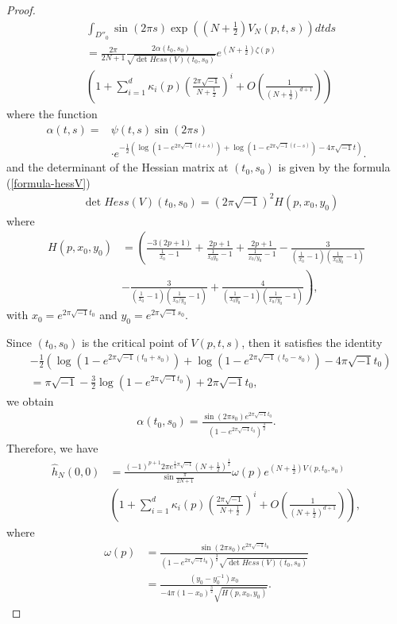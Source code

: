 \documentclass[12pt]{amsart}
\begin{document}
\begin{proof}
\begin{align}
  &\int_{D''_0}\sin(2\pi s)\exp\left((N+\frac{1}{2})V_N(p,t,s)\right)dtds\\\nonumber
        &=\frac{2\pi}{2N+1}\frac{2\alpha(t_0,s_0)}{\sqrt{\det Hess(V)(t_0,s_0)}}e^{(N+\frac{1}{2})\zeta(p)}\\\nonumber
        &\left(1+\sum_{i=1}^d\kappa_i(p)\left(\frac{2\pi\sqrt{-1}}{N+\frac{1}{2}}\right)^i+O\left(\frac{1}{(N+\frac{1}{2})^{d+1}}\right)\right)   
\end{align}
 where the function  
\begin{align}
    \alpha(t,s)=&\psi(t,s)\sin (2\pi s)\\\nonumber
    &\cdot e^{-\frac{1}{2}\left(\log(1-e^{2\pi\sqrt{-1}(t+s)})+\log(1-e^{2\pi\sqrt{-1}(t-s)})-4\pi\sqrt{-1}t\right)}.
\end{align}
and the determinant of the Hessian matrix at $(t_0,s_0)$ is given by the formula (\ref{formula-hessV})
\begin{align}
    &\det Hess(V)(t_0,s_0)=(2\pi\sqrt{-1})^2H(p,x_0,y_0)
\end{align}
where 
\begin{align}
    H(p,x_0,y_0)&=\left(\frac{-3(2p+1)}{\frac{1}{x_0}-1}+\frac{2p+1}{\frac{1}{x_0y_0}-1}+\frac{2p+1}{\frac{1}{x_0/y_0}-1}-\frac{3}{(\frac{1}{x_0}-1)(\frac{1}{x_0y_0}-1)}\right.\\\nonumber
    &\left.-\frac{3}{(\frac{1}{x_0}-1)(\frac{1}{x_0/y_0}-1)}+\frac{4}{(\frac{1}{x_0y_0}-1)(\frac{1}{x_0/y_0}-1)}\right),
\end{align}
with $x_0=e^{2\pi\sqrt{-1}t_0}$ and $y_0=e^{2\pi\sqrt{-1}s_0}$. 


 


Since $(t_0,s_0)$ is the critical point of $V(p,t,s)$, then it satisfies the identity
\begin{align}
    &-\frac{1}{2}\left(\log(1-e^{2\pi\sqrt{-1}(t_0+s_0)})+\log(1-e^{2\pi\sqrt{-1}(t_0-s_0)})-4\pi\sqrt{-1}t_0\right)\\\nonumber
    &=\pi\sqrt{-1}-\frac{3}{2}\log(1-e^{2\pi\sqrt{-1}t_0})+2\pi\sqrt{-1}t_0,
\end{align}
we obtain
\begin{align}
    \alpha(t_0,s_0)=\frac{\sin (2\pi s_0)e^{2\pi\sqrt{-1}t_0}}{(1-e^{2\pi\sqrt{-1}t_0})^{\frac{3}{2}}}.
\end{align}
Therefore, we have
\begin{align}
        \hat{h}_{N}(0,0)&=\frac{(-1)^{p+1}2\pi e^{\frac{1}{4}\pi\sqrt{-1}} (N+\frac{1}{2})^{\frac{1}{2}}}{\sin \frac{\pi}{2N+1}}\omega(p) e^{(N+\frac{1}{2})V(p,t_0,s_0)}\\\nonumber
        &\left(1+\sum_{i=1}^d\kappa_i(p)\left(\frac{2\pi\sqrt{-1}}{N+\frac{1}{2}}\right)^i+O\left(\frac{1}{(N+\frac{1}{2})^{d+1}}\right)\right),
    \end{align}
    where  
\begin{align}
   \omega(p)&=\frac{\sin (2\pi s_0)e^{2\pi\sqrt{-1}t_0}}{(1-e^{2\pi\sqrt{-1}t_0})^{\frac{3}{2}}\sqrt{\det Hess(V)(t_0,s_0)}}\\\nonumber
   &=\frac{(y_0-y_0^{-1})x_0}{-4\pi (1-x_0)^\frac{3}{2}\sqrt{H(p,x_0,y_0)}}.
\end{align}
\end{proof}
\end{document}
